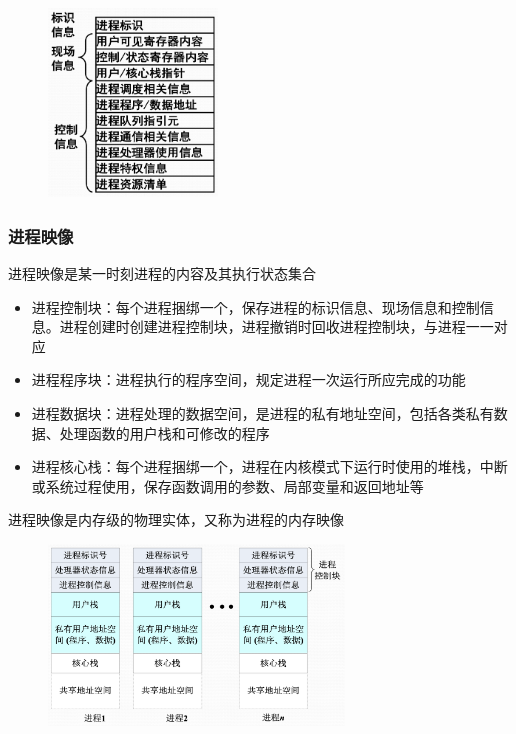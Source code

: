 \documentclass[cs4size,a4paper,10pt]{ctexart}
\begin{document}
	\begin{figure}[H]
		\centering
		\includegraphics[width=0.4\textwidth]{img/2.3.2.1}
	\end{figure}


	\subsubsection{进程映像}
	进程映像是某一时刻进程的内容及其执行状态集合
	\begin{itemize}
		\item 进程控制块：每个进程捆绑一个，保存进程的标识信息、现场信息和控制信息。进程创建时创建进程控制块，进程撤销时回收进程控制块，与进程一一对应
		\item 进程程序块：进程执行的程序空间，规定进程一次运行所应完成的功能
		\item 进程数据块：进程处理的数据空间，是进程的私有地址空间，包括各类私有数据、处理函数的用户栈和可修改的程序
		\item 进程核心栈：每个进程捆绑一个，进程在内核模式下运行时使用的堆栈，中断或系统过程使用，保存函数调用的参数、局部变量和返回地址等
	\end{itemize}

	进程映像是内存级的物理实体，又称为进程的内存映像

	\begin{figure}[H]
		\centering
		\includegraphics[width=0.7\textwidth]{img/2.3.2.2}
	\end{figure}
\end{document}
